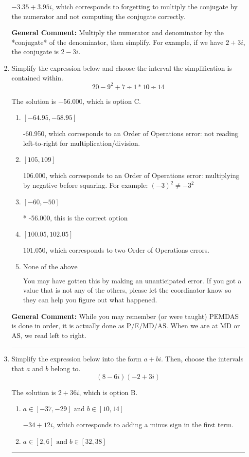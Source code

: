 \documentclass{extbook}[14pt]
\newcommand{\litem}[1]{\item #1

\rule{\textwidth}{0.4pt}}
\begin{document}
\begin{enumerate}
{\begin{enumerate}[label=\Alph*.]
 $-3.35  + 3.95 i$, which corresponds to forgetting to multiply the conjugate by the numerator and not computing the conjugate correctly.
\end{enumerate}

\textbf{General Comment:} Multiply the numerator and denominator by the *conjugate* of the denominator, then simplify. For example, if we have $2+3i$, the conjugate is $2-3i$.
}
\litem{
Simplify the expression below and choose the interval the simplification is contained within.
\[ 20 - 9^2 + 7 \div 1 * 10 \div 14 \]

The solution is \( -56.000 \), which is option C.\begin{enumerate}[label=\Alph*.]
\item \( [-64.95, -58.95] \)

 -60.950, which corresponds to an Order of Operations error: not reading left-to-right for multiplication/division.
\item \( [105, 109] \)

 106.000, which corresponds to an Order of Operations error: multiplying by negative before squaring. For example: $(-3)^2 \neq -3^2$
\item \( [-60, -50] \)

* -56.000, this is the correct option
\item \( [100.05, 102.05] \)

 101.050, which corresponds to two Order of Operations errors.
\item \( \text{None of the above} \)

 You may have gotten this by making an unanticipated error. If you got a value that is not any of the others, please let the coordinator know so they can help you figure out what happened.
\end{enumerate}

\textbf{General Comment:} While you may remember (or were taught) PEMDAS is done in order, it is actually done as P/E/MD/AS. When we are at MD or AS, we read left to right.
}
\litem{
Simplify the expression below into the form $a+bi$. Then, choose the intervals that $a$ and $b$ belong to.
\[ (8 - 6 i)(-2 + 3 i) \]

The solution is \( 2 + 36 i \), which is option B.\begin{enumerate}[label=\Alph*.]
\item \( a \in [-37, -29] \text{ and } b \in [10, 14] \)

 $-34 + 12 i$, which corresponds to adding a minus sign in the first term.
\item \( a \in [2, 6] \text{ and } b \in [32, 38] \)


\end{enumerate}}
\end{enumerate}
\end{document}
